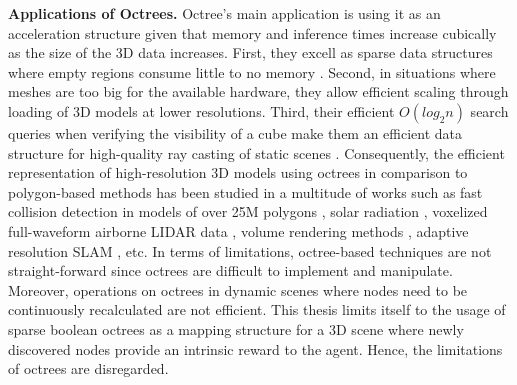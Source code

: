 \textbf{Applications of Octrees.}
Octree's main application is using it as an acceleration structure given that memory and inference times increase cubically as the size of the 3D data increases. 
First, they excell as sparse data structures where empty regions consume little to no memory \cite{laine2010efficient}.
Second, in situations where meshes are too big for the available hardware, they allow efficient scaling through loading of 3D models at lower resolutions. 
Third, their efficient $O(log_{2}n)$ search queries when verifying the visibility of a cube make them an efficient data structure for high-quality ray casting of static scenes \cite{gobbetti2008single}.
Consequently, the efficient representation of high-resolution 3D models using octrees in comparison to polygon-based methods has been studied in a multitude of works such as fast collision detection in models of over 25M polygons \cite{melero2019fast}, solar radiation \cite{liang2017sparse}, voxelized full-waveform airborne LIDAR data \cite{miltiadou2021comparative}, volume rendering methods \cite{knoll2006survey}, adaptive resolution SLAM \cite{vespa2019adaptive}, etc. In terms of limitations, octree-based techniques are not straight-forward since octrees are difficult to implement and manipulate. Moreover, operations on octrees in dynamic scenes where nodes need to be continuously recalculated are not efficient. This thesis limits itself to the usage of sparse boolean octrees as a mapping structure for a 3D scene where newly discovered nodes provide an intrinsic reward to the agent. Hence, the limitations of octrees are disregarded.





